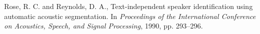\documentclass[a4paper,twocolumn]{article}
\begin{document}
\begin{thebibliography}{9}
        Rose, R. C. and Reynolds, D. A.,
        Text-independent speaker identification using automatic acoustic segmentation.
        In \textit{Proceedings of the International Conference on Acoustics, Speech, and
        Signal Processing},
        1990,
        pp. 293–296.

\end{thebibliography}
\end{document}

